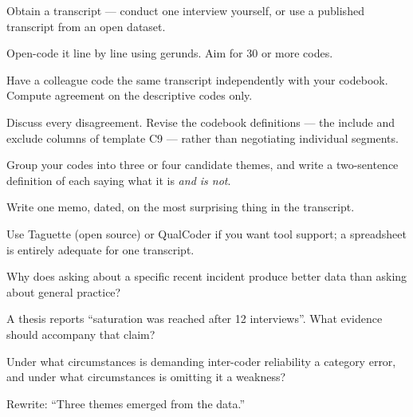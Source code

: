 \begin{lab}
Obtain a transcript --- conduct one interview yourself, or use a published
transcript from an open dataset.

\begin{tightnum}
  \item Open-code it line by line using gerunds. Aim for 30 or more codes.
  \item Have a colleague code the same transcript independently with your
    codebook. Compute agreement on the descriptive codes only.
  \item Discuss every disagreement. Revise the codebook definitions --- the
    include and exclude columns of template C9 --- rather than negotiating
    individual segments.
  \item Group your codes into three or four candidate themes, and write a
    two-sentence definition of each saying what it is \emph{and is not}.
  \item Write one memo, dated, on the most surprising thing in the transcript.
\end{tightnum}

\medskip
Use Taguette (open source) or QualCoder if you want tool support; a spreadsheet
is entirely adequate for one transcript.
\end{lab}

\begin{checkpoint}
\begin{tightnum}
  \item Why does asking about a specific recent incident produce better data
    than asking about general practice?
  \item A thesis reports ``saturation was reached after 12 interviews''. What
    evidence should accompany that claim?
  \item Under what circumstances is demanding inter-coder reliability a
    category error, and under what circumstances is omitting it a weakness?
  \item Rewrite: ``Three themes emerged from the data.''
\end{tightnum}
\end{checkpoint}

